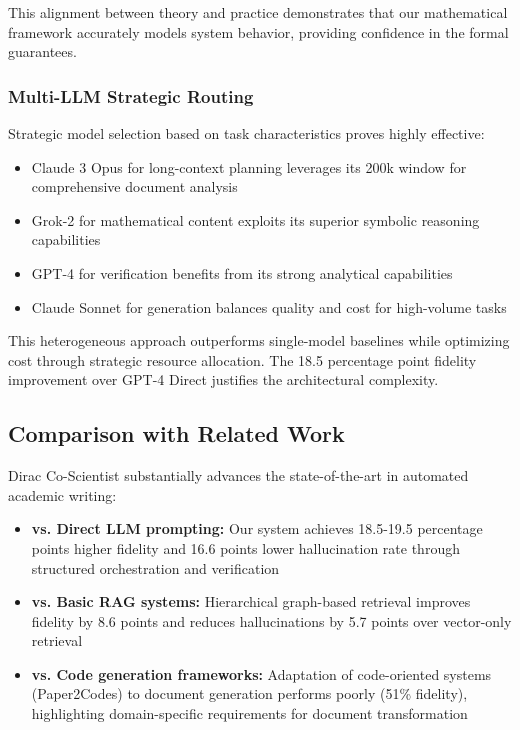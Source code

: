 \documentclass{ieeeaccess}
\begin{document}
This alignment between theory and practice demonstrates that our mathematical framework accurately models system behavior, providing confidence in the formal guarantees.

\subsubsection{Multi-LLM Strategic Routing}

Strategic model selection based on task characteristics proves highly effective:

\begin{itemize}
\item Claude 3 Opus for long-context planning leverages its 200k window for comprehensive document analysis
\item Grok-2 for mathematical content exploits its superior symbolic reasoning capabilities
\item GPT-4 for verification benefits from its strong analytical capabilities
\item Claude Sonnet for generation balances quality and cost for high-volume tasks
\end{itemize}

This heterogeneous approach outperforms single-model baselines while optimizing cost through strategic resource allocation. The 18.5 percentage point fidelity improvement over GPT-4 Direct justifies the architectural complexity.

\subsection{Comparison with Related Work}

Dirac Co-Scientist substantially advances the state-of-the-art in automated academic writing:

\begin{itemize}
\item \textbf{vs. Direct LLM prompting:} Our system achieves 18.5-19.5 percentage points higher fidelity and 16.6 points lower hallucination rate through structured orchestration and verification
\item \textbf{vs. Basic RAG systems:} Hierarchical graph-based retrieval improves fidelity by 8.6 points and reduces hallucinations by 5.7 points over vector-only retrieval
\item \textbf{vs. Code generation frameworks:} Adaptation of code-oriented systems (Paper2Codes) to document generation performs poorly (51\% fidelity), highlighting domain-specific requirements for document transformation
\end{itemize}
\end{document}
